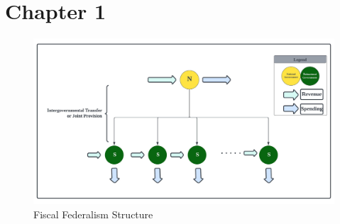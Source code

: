 
\section{Chapter 1}
\begin{figure}[H]
    \centering
    \includegraphics[scale=0.6]{Chapter-1/Figures/fiscal federalism.jpeg}
    \caption[Fiscal Federalism Structure]{Fiscal Federalism Structure
        \texttt{} }
    \label{Figure 1.1}
\end{figure}

\clearpage

